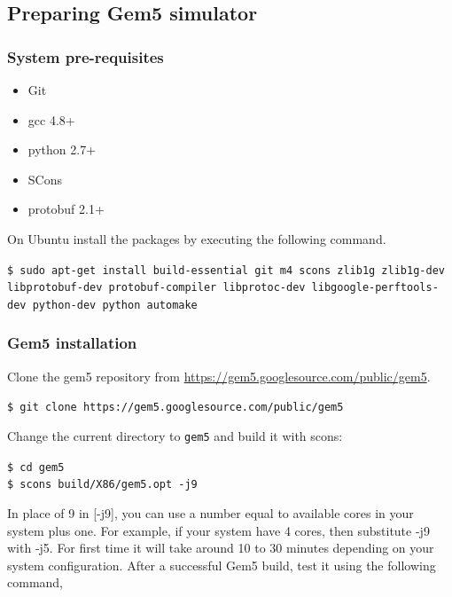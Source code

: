 \documentclass[12pt]{article}
\begin{document}
{\subsection{Preparing Gem5 simulator}
\subsubsection*{System pre-requisites}
\begin{itemize}
    \item Git
    \item gcc 4.8+
    \item python 2.7+
    \item SCons
    \item protobuf 2.1+
\end{itemize}
\begin{flushleft}
On Ubuntu install the packages by executing the following command. 

\vspace{0.25cm}
\noindent
\texttt{\$ sudo apt-get install build-essential git m4 scons zlib1g zlib1g-dev libprotobuf-dev protobuf-compiler libprotoc-dev  libgoogle-perftools-dev python-dev python automake}
\end{flushleft} 
\vspace{5mm}
\subsubsection*{Gem5 installation} 
Clone the gem5 repository from \url{https://gem5.googlesource.com/public/gem5}.

\vspace{0.25cm}
\noindent
\texttt{\$ git clone https://gem5.googlesource.com/public/gem5}

\vspace{0.25cm}
\noindent
Change the current directory to \texttt{gem5} and build it with scons:

\vspace{0.25cm}
\noindent
\texttt{\$ cd gem5 \\
 \$ scons build/X86/gem5.opt -j9}

\vspace{0.25cm}
\noindent
In place of 9 in [-j9], you can use a number equal to available cores in your system plus one. 
For example, if your system have 4 cores, then substitute -j9 with -j5. 
For first time it will take around 10 to 30 minutes depending on your system configuration. 
After a successful Gem5 build, test it using the following command,


}
\end{document}
